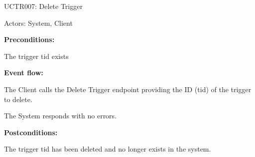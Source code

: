 \begin{ucbox}{UCTR007: Delete Trigger}
\label{UCTR007}

Actors: System, Client

\textbf{Preconditions:}

\ucitem The trigger tid exists

\textbf{Event flow:}

\ucitem The Client calls the Delete Trigger endpoint providing the ID (tid) of the trigger to delete.

\ucitem The System responds with no errors.

\textbf{Postconditions:}

\ucitem The trigger tid has been deleted and no longer exists in the system.

\end{ucbox}
\newpage